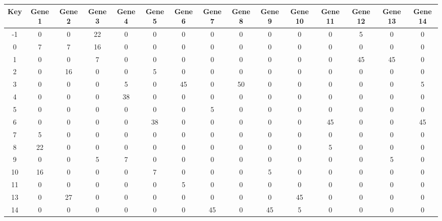 \begin{tabular}{|c|c|c|c|c|c|c|c|c|c|c|c|c|c|c|}
\hline
Key & Gene 1 & Gene 2 & Gene 3 & Gene 4 & Gene 5 & Gene 6 & Gene 7 & Gene 8 & Gene 9 & Gene 10 & Gene 11 & Gene 12 & Gene 13 & Gene 14 \\
\hline
-1 & 0 & 0 & 22 & 0 & 0 & 0 & 0 & 0 & 0 & 0 & 0 & 5 & 0 & 0 \\
0 & 7 & 7 & 16 & 0 & 0 & 0 & 0 & 0 & 0 & 0 & 0 & 0 & 0 & 0 \\
1 & 0 & 0 & 7 & 0 & 0 & 0 & 0 & 0 & 0 & 0 & 0 & 45 & 45 & 0 \\
2 & 0 & 16 & 0 & 0 & 5 & 0 & 0 & 0 & 0 & 0 & 0 & 0 & 0 & 0 \\
3 & 0 & 0 & 0 & 5 & 0 & 45 & 0 & 50 & 0 & 0 & 0 & 0 & 0 & 5 \\
4 & 0 & 0 & 0 & 38 & 0 & 0 & 0 & 0 & 0 & 0 & 0 & 0 & 0 & 0 \\
5 & 0 & 0 & 0 & 0 & 0 & 0 & 5 & 0 & 0 & 0 & 0 & 0 & 0 & 0 \\
6 & 0 & 0 & 0 & 0 & 38 & 0 & 0 & 0 & 0 & 0 & 45 & 0 & 0 & 45 \\
7 & 5 & 0 & 0 & 0 & 0 & 0 & 0 & 0 & 0 & 0 & 0 & 0 & 0 & 0 \\
8 & 22 & 0 & 0 & 0 & 0 & 0 & 0 & 0 & 0 & 0 & 5 & 0 & 0 & 0 \\
9 & 0 & 0 & 5 & 7 & 0 & 0 & 0 & 0 & 0 & 0 & 0 & 0 & 5 & 0 \\
10 & 16 & 0 & 0 & 0 & 7 & 0 & 0 & 0 & 5 & 0 & 0 & 0 & 0 & 0 \\
11 & 0 & 0 & 0 & 0 & 0 & 5 & 0 & 0 & 0 & 0 & 0 & 0 & 0 & 0 \\
13 & 0 & 27 & 0 & 0 & 0 & 0 & 0 & 0 & 0 & 45 & 0 & 0 & 0 & 0 \\
14 & 0 & 0 & 0 & 0 & 0 & 0 & 45 & 0 & 45 & 5 & 0 & 0 & 0 & 0 \\
\hline
\end{tabular}